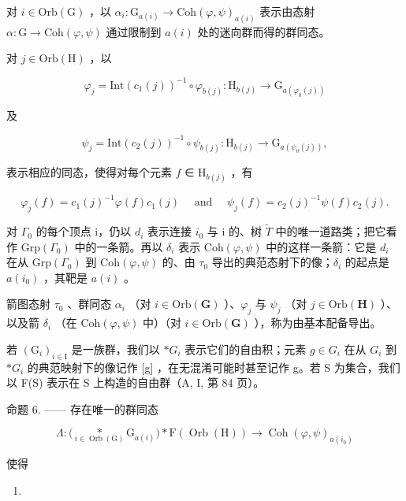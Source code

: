 对 \(i \in \mathrm{Orb}(\mathrm{G})\) ，以 \(\alpha_i \colon \mathrm{G}_{a(i)} \to \mathrm{Coh}(\varphi, \psi)_{a(i)}\) 表示由态射 \(\alpha \colon \mathrm{G} \to \mathrm{Coh}(\varphi, \psi)\) 通过限制到 \(a(i)\) 处的迷向群而得的群同态。

对 \(j\in \mathrm{Orb(H)}\) ，以

\[
\varphi_ {j} = \mathrm{Int} (c _ {1} (j)) ^ {- 1} \circ \varphi_ {b (j)} \colon \mathrm{H} _ {b (j)} \to \mathrm{G} _ {a (\varphi_ {0} (j))}
\]

及

\[
\psi_ {j} = \mathrm{Int} (c _ {2} (j)) ^ {- 1} \circ \psi_ {b (j)} \colon \mathrm{H} _ {b (j)} \to \mathrm{G} _ {a (\psi_ {0} (j))},
\]

表示相应的同态，使得对每个元素 \(f\) ∈ \(\mathrm{H}_{b(j)}\) ，有

\[
\varphi_ {j} (f) = c _ {1} (j) ^ {- 1} \varphi (f) c _ {1} (j) \quad \text { and } \quad \psi_ {j} (f) = c _ {2} (j) ^ {- 1} \psi (f) c _ {2} (j).\tag{6}
\]

对 \(\Gamma_{0}\) 的每个顶点 i，仍以 \(d_{i}\) 表示连接 \(i_{0}\) 与 i 的、树 \(\widetilde{T}\) 中的唯一道路类；把它看作 \(\mathrm{Grp}(\Gamma_{0})\) 中的一条箭。再以 \(\delta_{i}\) 表示 \(\mathrm{Coh}(\varphi,\psi)\) 中的这样一条箭：它是 \(d_{i}\) 在从 \(\mathrm{Grp}(\Gamma_{0})\) 到 \(\mathrm{Coh}(\varphi,\psi)\) 的、由 \(\tau_{0}\) 导出的典范态射下的像；\(\delta_{i}\) 的起点是 \(a(i_{0})\) ，其靶是 \(a(i)\) 。

箭图态射 \(\tau_0\) 、群同态 \(\alpha_i\) （对 \(i \in \mathrm{Orb}(\mathbf{G})\) ）、\(\varphi_j\) 与 \(\psi_j\) （对 \(j \in \mathrm{Orb}(\mathbf{H})\) ）、以及箭 \(\delta_i\) （在 \(\mathrm{Coh}(\varphi, \psi)\) 中）（对 \(i \in \mathrm{Orb}(\mathbf{G})\) ），称为由基本配备导出。

若 \((\mathrm{G}_{i})_{i\in\mathrm{I}}\) 是一族群，我们以 \(*G_{i}\) 表示它们的自由积；元素 \(g\in G_{i}\) 在从 \(G_{i}\) 到 \(*G_{i}\) 的典范映射下的像记作 {[}g{]} ，在无混淆可能时甚至记作 g。若 S 为集合，我们以 F(S) 表示在 S 上构造的自由群（A, I, 第 84 页）。

命题 6. —— 存在唯一的群同态

\[
\Lambda \colon \big (\underset {i \in \operatorname{Orb} (\mathrm{G})} {*} \mathrm{G} _ {a (i)} \big) * \mathrm{F} (\operatorname{Orb} (\mathrm{H})) \to \operatorname{Coh} (\varphi , \psi) _ {a (i _ {0})}
\]

使得

\begin{enumerate}
\def\labelenumi{(\arabic{enumi})}
\setcounter{enumi}{6}
\tightlist
\item
\end{enumerate}

